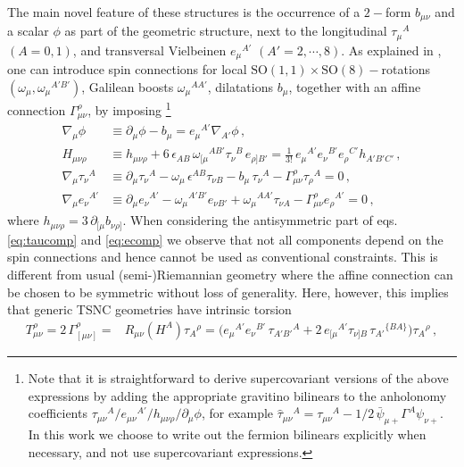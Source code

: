 \documentclass[a4paper,10pt,openany]{article}
\def\rmR{\mathrm{R}}
\begin{document}
	The main novel feature of these structures is the occurrence of a $2-$form $b_{\mu\nu}$ and a scalar $\phi$ as part of the geometric structure, next to the longitudinal $\tau_\mu{}^A$ $(A=0,1)$, and transversal Vielbeinen $e_\mu{}^{A'}$ $(A'=2,\cdots,8)$. As explained in \cite{Bergshoeff:2021bmc}, one can introduce spin connections for local $\mathrm{SO}(1,1)\times\mathrm{SO}(8)-$rotations $(\omega_\mu,\omega_\mu{}^{A'B'})$, Galilean boosts $\omega_\mu{}^{AA'}$, dilatations $b_\mu$, together with an affine connection $\Gamma_{\mu\nu}^\rho$, by imposing \footnote{Note that it is straightforward to derive supercovariant versions of the above expressions by adding the appropriate gravitino bilinears to the anholonomy coefficients $\tau_{\mu\nu}{}^A/e_{\mu\nu}{}^{A'}/h_{\mu\nu\rho}/\partial_\mu\phi$, for example $\hat\tau_{\mu\nu}{}^A = \tau_{\mu\nu}{}^A - 1/2\,\bar\psi_{\mu+}\Gamma^A\psi_{\nu+}$. In this work we choose to write out the fermion bilinears explicitly when necessary, and not use supercovariant expressions.}
	\begin{subequations}\label{eq:metcomp}
		\begin{align}
			\nabla_\mu\phi &\equiv \partial_\mu\phi - b_\mu = e_\mu{}^{A'}\nabla_{A'}\phi\,,\\
			H_{\mu\nu\rho} &\equiv h_{\mu\nu\rho} + 6\,\epsilon_{AB}\,\omega_{[\mu}{}^{AB'}\tau_{\nu}{}^B\,e_{\rho]B'} = \frac{1}{3!}\,e_\mu{}^{A'}e_\nu{}^{B'}e_\rho{}^{C'}h_{A'B'C'}\,,\\
			\nabla_\mu\tau_\nu{}^A &\equiv \partial_\mu\tau_\nu{}^A - \omega_\mu\,\epsilon^{AB}\tau_{\nu B} - b_\mu\,\tau_\nu{}^A - \Gamma_{\mu\nu}^\rho\tau_\rho{}^A = 0\,,\label{eq:taucomp}\\
			\nabla_\mu e_\nu{}^{A'} &\equiv \partial_\mu e_\nu{}^{A'} - \omega_\mu{}^{A'B'} e_{\nu B'} + \omega_\mu{}^{AA'}\tau_{\nu A} - \Gamma_{\mu\nu}^\rho e_\rho{}^{A'}=0\,,\label{eq:ecomp}
		\end{align}
	\end{subequations}
	where $h_{\mu\nu\rho}=3\,\partial_{[\mu}b_{\nu\rho]}$. When considering the antisymmetric part of eqs. \eqref{eq:taucomp} and \eqref{eq:ecomp} we observe that not all components depend on the spin connections and hence cannot be used as conventional constraints. This is different from usual (semi-)Riemannian geometry where the affine connection can be chosen to be symmetric without loss of generality. Here, however, this implies that generic TSNC geometries have intrinsic torsion \cite{Figueroa-OFarrill:2020gpr}
	\begin{align}
		T_{\mu\nu}^\rho = 2\,\Gamma_{[\mu\nu]}^\rho = &R_{\mu\nu}(H^A)\tau_A{}^\rho = \big(e_\mu{}^{A'}e_\nu{}^{B'}\,\tau_{A'B'}{}^A + 2\,e_{[\mu}{}^{A'}\tau_{\nu]B}\,\tau_{A'}{}^{\{BA\}}\big)\tau_A{}^\rho\,,
	\end{align}
\end{document}
